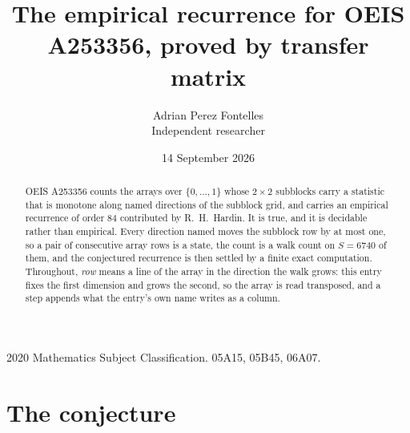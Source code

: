 \documentclass[11pt,a4paper]{article}
\title{The empirical recurrence for OEIS A253356, proved by transfer matrix}
\author{Adrian Perez Fontelles\\ \small Independent researcher}
\date{14 September 2026}
\theoremstyle{plain}
\theoremstyle{definition}
\begin{document}
\maketitle

\begin{abstract}
OEIS A253356 counts the arrays over $\{0,\dots,1\}$ whose $2\times2$ subblocks carry a
statistic that is monotone along named directions of the subblock grid, and carries an
empirical recurrence of order $84$ contributed by R.~H.~Hardin. It is true, and it is
decidable rather than empirical. Every direction named moves the subblock row by at most one,
so a pair of consecutive array rows is a state, the count is a walk count on $S=6740$ of them,
and the conjectured recurrence is then settled by a finite exact computation.
 Throughout, \emph{row} means a line of the array in the direction the walk grows: this entry fixes the first dimension and grows the second, so the array is read transposed, and a step appends what the entry's own name writes as a column.\end{abstract}

\noindent\small 2020 Mathematics Subject Classification. 05A15, 05B45, 06A07.\normalsize

\section{The conjecture}
\end{document}
